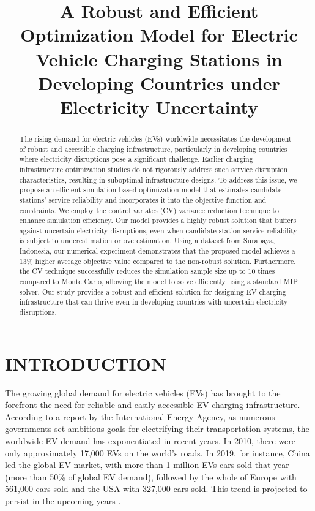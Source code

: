 \documentclass[preprint]{oscmjournal}
\title{
A Robust and Efficient Optimization Model for Electric Vehicle Charging Stations in Developing Countries under Electricity Uncertainty
}
\theoremstyle{remark}
\begin{document}
\maketitle

\begin{abstract}
    The rising demand for electric vehicles (EVs) worldwide necessitates the development of robust and accessible charging infrastructure, particularly in developing countries where electricity disruptions pose a significant challenge. Earlier charging infrastructure optimization studies do not rigorously address such service disruption characteristics, resulting in suboptimal infrastructure designs. To address this issue, we propose an efficient simulation-based optimization model that estimates candidate stations' service reliability and incorporates it into the objective function and constraints. We employ the control variates (CV) variance reduction technique to enhance simulation efficiency. Our model provides a highly robust solution that buffers against uncertain electricity disruptions, even when candidate station service reliability is subject to underestimation or overestimation. Using a dataset from Surabaya, Indonesia, our numerical experiment demonstrates that the proposed model achieves a 13\% higher average objective value compared to the non-robust solution. Furthermore, the CV technique successfully reduces the simulation sample size up to 10 times compared to Monte Carlo, allowing the model to solve efficiently using a standard MIP solver. Our study provides a robust and efficient solution for designing EV charging infrastructure that can thrive even in developing countries with uncertain electricity disruptions.
\end{abstract}


\section{INTRODUCTION}
\label{sec:intro}

The growing global demand for electric vehicles (EVs) has brought to the forefront the need for reliable and easily accessible EV charging infrastructure. According to a report by the International Energy Agency, as numerous governments set ambitious goals for electrifying their transportation systems, the worldwide EV demand has exponentiated in recent years. In 2010, there were only approximately 17,000 EVs on the world’s roads. In 2019, for instance, China led the global EV market, with more than 1 million EVs cars sold that year (more than 50\% of global EV demand), followed by the whole of Europe with 561,000 cars sold and the USA with 327,000 cars sold. This trend is projected to persist in the upcoming years \autocite{evoutlook}.
\end{document}
